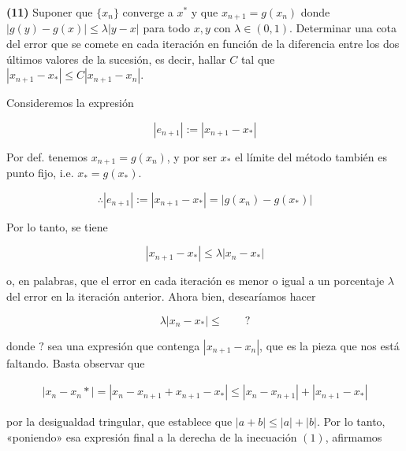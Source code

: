 \documentclass[12pt]{article}
\begin{document}
\pagebreak 

\begin{myframe}
    \textbf{(11)} Suponer que $\{x_n\}$ converge a $x^*$ y que $x_{n+1} = g(x_n)$ donde
    $|g(y) - g(x)| \leq \lambda |y - x|$ para todo $x,y$ con $\lambda \in
    (0,1)$. Determinar una cota del error que se comete en cada iteración en
    función de la diferencia entre los dos últimos valores de la sucesión, es
    decir, hallar $C$ tal que $|x_{n+1} - x_*| \leq C|x_{n+1} - x_n|$.
\end{myframe}

Consideremos la expresión 

\begin{equation*}
    \left| e_{n+1} \right| := \left| x_{n+1} - x_* \right| 
\end{equation*}

Por def. tenemos $x_{n+1} = g(x_n)$, y por ser $x_*$ el límite del método
también es punto fijo, i.e. $x_* = g(x_*)$.

\begin{equation*}
    \therefore \left| e_{n+1} \right| := \left| x_{n+1} - x_* \right| = \left| g(x_n) - g(x_*) \right| 
\end{equation*}

Por lo tanto, se tiene 

\begin{equation}
    \left| x_{n+1} - x_* \right| \leq \lambda \left| x_n - x_* \right| 
\end{equation}

o, en palabras, que el error en cada iteración es menor o igual a un porcentaje
$\lambda$ del error en la iteración anterior. Ahora bien, desearíamos hacer 

\begin{equation*}
    \lambda \left| x_n - x_* \right| \leq \qquad ?
\end{equation*}

donde $?$ sea una expresión que contenga $\left| x_{n+1} - x_{n} \right| $, que
es la pieza que nos está faltando. Basta observar que 

\begin{align*}
    \left| x_n - x_n* \right| = \left| x_n - x_{n+1} + x_{n+1} - x_* \right|
    \leq \left| x_n - x_{n+1} \right| + \left| x_{n+1} - x_* \right| 
\end{align*}

por la desigualdad tringular, que establece que $\left| a + b \right| \leq
\left| a \right| + \left| b \right| $. Por lo tanto, «poniendo» esa expresión
final a la derecha de la inecuación $(1)$, afirmamos 
\end{document}
